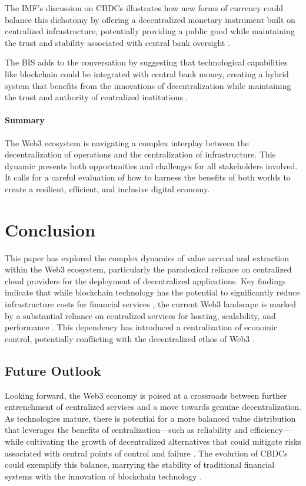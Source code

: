\documentclass{article}
\begin{document}
The IMF's discussion on CBDCs illustrates how new forms of currency could balance this dichotomy by offering a decentralized monetary instrument built on centralized infrastructure, potentially providing a public good while maintaining the trust and stability associated with central bank oversight \cite{imfcrypto}.

The BIS adds to the conversation by suggesting that technological capabilities like blockchain could be integrated with central bank money, creating a hybrid system that benefits from the innovations of decentralization while maintaining the trust and authority of centralized institutions \cite{bismonetary}.

\paragraph{Summary} The Web3 ecosystem is navigating a complex interplay between the decentralization of operations and the centralization of infrastructure. This dynamic presents both opportunities and challenges for all stakeholders involved. It calls for a careful evaluation of how to harness the benefits of both worlds to create a resilient, efficient, and inclusive digital economy.

\section{Conclusion}

This paper has explored the complex dynamics of value accrual and extraction within the Web3 ecosystem, particularly the paradoxical reliance on centralized cloud providers for the deployment of decentralized applications. Key findings indicate that while blockchain technology has the potential to significantly reduce infrastructure costs for financial services \cite{pwcblockchain}, the current Web3 landscape is marked by a substantial reliance on centralized services for hosting, scalability, and performance \cite{ibmblockchain}. This dependency has introduced a centralization of economic control, potentially conflicting with the decentralized ethos of Web3 \cite{tapscott2016blockchain}.

\subsection{Future Outlook} 

Looking forward, the Web3 economy is poised at a crossroads between further entrenchment of centralized services and a move towards genuine decentralization. As technologies mature, there is potential for a more balanced value distribution that leverages the benefits of centralization—such as reliability and efficiency—while cultivating the growth of decentralized alternatives that could mitigate risks associated with central points of control and failure \cite{bismonetary}. The evolution of CBDCs could exemplify this balance, marrying the stability of traditional financial systems with the innovation of blockchain technology \cite{imfcrypto}.
\end{document}
